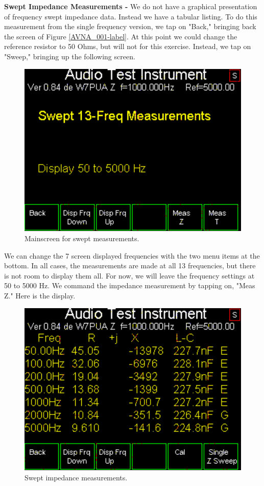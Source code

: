 \textbf{Swept Impedance Measurements - }  We do not have a graphical presentation of frequency swept impedance data.  Instead we have a tabular listing. To do this measurement from the single frequency version, we tap on "Back," bringing back the screen of Figure \ref{AVNA_001-label}. At this point we could change the reference resistor to 50 Ohms, but will not for this exercise. Instead, we tap on "Sweep," bringing up the following screen.
\begin{figure}[H]
\begin{center}
\includegraphics[scale=0.75]{./images/AVNA_007.pdf}
\caption{Mainscreen for swept measurements.}
\label{AVNA_007-label}
\end{center}
\end{figure}
We can change the 7 screen displayed frequencies with the two menu items at the bottom.  In all cases, the measurements are made at all 13 frequencies, but there is not room to display them all.  For now, we will leave the frequency settings at 50 to 5000 Hz.  We command the impedance measurement by tapping on, "Meas Z."  Here is the display.
\begin{figure}[H]
\begin{center}
\includegraphics[scale=0.75]{./images/AVNA_009.pdf}
\caption{Swept impedance measurements.}
\label{AVNA_009-label}
\end{center}
\end{figure}
